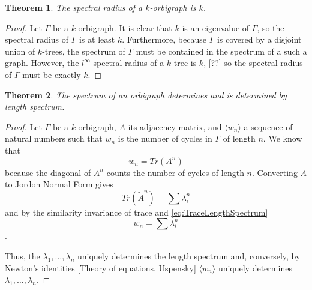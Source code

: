 \documentclass[12pt]{article}
\theoremstyle{plain}
\newtheorem{theorem}{Theorem}
\theoremstyle{definition}
\theoremstyle{remark}
\begin{document}
    \begin{theorem}\label{thm:SpectralRadius}
      The spectral radius of a $k$-orbigraph is $k$.
    \end{theorem}
    \begin{proof}
      Let $\Gamma$ be a $k$-orbigraph. It is clear that $k$ is an eigenvalue of $\Gamma$, so the spectral radius of $\Gamma$ is at least $k$. Furthermore, because $\Gamma$ is covered by a disjoint union of $k$-trees, the spectrum of $\Gamma$ must be contained in the spectrum of a such a graph. However, the $l^\infty$ spectral radius of a $k$-tree is $k$, [??] so the spectral radius of $\Gamma$ must be exactly $k$. 
    \end{proof}

    \begin{theorem}\label{thm:LengthSpectrum}
      The spectrum of an orbigraph determines and is determined by length spectrum.
    \end{theorem}
    \begin{proof}
      Let $\Gamma$ be a $k$-orbigraph, $A$ its adjacency matrix, and $\langle w_n \rangle$ a sequence of natural numbers such that $w_n$ is the number of cycles in $\Gamma$ of length $n$. We know that
        \begin{equation}\label{eq:TraceLengthSpectrum}
          w_n = Tr(A^n)
        \end{equation}
      because the diagonal of $A^n$ counts the number of cycles of length $n$. Converting $A$ to Jordon Normal Form gives
      \begin{equation*}
        Tr(\tilde{A}^n) = \sum \lambda_i^n
      \end{equation*}
      and by the similarity invariance of trace and \ref{eq:TraceLengthSpectrum}
      \begin{equation*}
        w_n = \sum \lambda_i^n
      \end{equation*}.

      Thus, the $\lambda_1, \ldots, \lambda_n$ uniquely determines the length spectrum and, conversely, by Newton's identities [Theory of equations, Uspensky] $\langle w_n \rangle$ uniquely determines $\lambda_1, \ldots, \lambda_n$.

    \end{proof}
\end{document}
